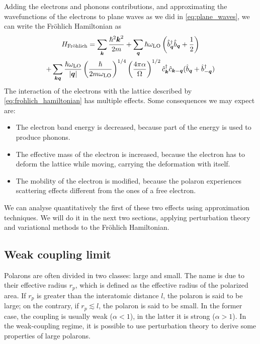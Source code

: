 Adding the electrons and phonons contributions, and approximating the wavefunctions of the electrons to plane waves as we did in \cref{eq:plane_waves}, we can write the Fröhlich Hamiltonian as
\begin{multline} \label{eq:frohlich_hamiltonian}
    H_\text{Fröhlich} = \sum_{\mathbf{\boldsymbol{k}}} \frac{\hslash^2\mathbf{\boldsymbol{k}}^2}{2m}
    + \sum_{\mathbf{\boldsymbol{q}}} \hslash \omega_\text{LO} \left( \hat{b}^\dagger_{ \mathbf{\boldsymbol{q}}} \hat{b}_{ \mathbf{\boldsymbol{q}}} + \frac{1}{2} \right)
    \\ + \sum_{\mathbf{\boldsymbol{k}}\mathbf{\boldsymbol{q}}} \frac{\hslash \omega_\text{LO}}{|\mathbf{\boldsymbol{q}}|} \left(\frac{\hslash}{2m\omega_\text{LO}}\right)^{1/4} \left(\frac{4\pi\alpha}{\Omega}\right)^{1/2} \hat{c}^\dagger_{\mathbf{\boldsymbol{k}}}\hat{c}_{\mathbf{\boldsymbol{k}}-\mathbf{\boldsymbol{q}}} (\hat{b}_{\mathbf{\boldsymbol{q}}} + \hat{b}^\dagger_{-\mathbf{\boldsymbol{q}}})
\end{multline}
The interaction of the electrons with the lattice described by \cref{eq:frohlich_hamiltonian} has multiple effects. Some consequences we may expect are:
\begin{itemize}
    \item The electron band energy is decreased, because part of the energy is used to produce phonons.
    \item The effective mass of the electron is increased, because the electron has to deform the lattice while moving, carrying the deformation with itself.
    \item The mobility of the electron is modified, because the polaron experiences scattering effects different from the ones of a free electron.
\end{itemize}
We can analyse quantitatively the first of these two effects using approximation techniques. We will do it in the next two sections, applying perturbation theory and variational methods to the Fröhlich Hamiltonian.

\subsection{Weak coupling limit} \label{sec:weak_frohlich}
Polarons are often divided in two classes: large and small. The name is due to their effective radius $r_p$, which is defined as the effective radius of the polarized area. If $r_p$ is greater than the interatomic distance $l$, the polaron is said to be large; on the contrary, if $r_p \lesssim l$, the polaron is said to be small. In the former case, the coupling is usually weak ($\alpha < 1$), in the latter it is strong ($\alpha > 1$). In the weak-coupling regime, it is possible to use perturbation theory to derive some properties of large polarons.

